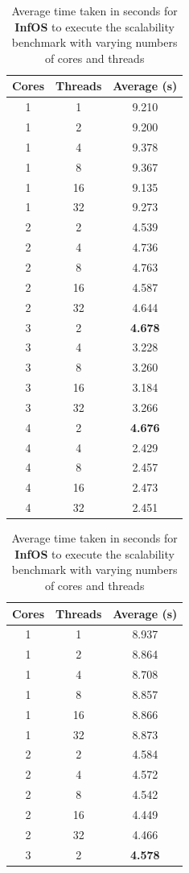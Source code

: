 \documentclass[bsc,frontabs,singlespacing,parskip,deptreport]{infthesis}
\begin{document}
\begin{table}[h]
\parbox{.45\linewidth}{
\centering
\scriptsize
\begin{tabular}{ccc}
\toprule
Cores &Threads &Average (s) \\
\midrule
1 &1 &9.210 \\
\midrule
1 &2 &9.200 \\
1 &4 &9.378 \\
1 &8 &9.367 \\
1 &16 &9.135 \\
1 &32 &9.273 \\
\midrule
2 &2 &4.539 \\
2 &4 &4.736 \\
2 &8 &4.763 \\
2 &16 &4.587 \\
2 &32 &4.644 \\
\midrule
3 &2 &\textbf{4.678} \\
3 &4 &3.228 \\
3 &8 &3.260 \\
3 &16 &3.184 \\
3 &32 &3.266 \\
\midrule
4 &2 &\textbf{4.676} \\
4 &4 &2.429 \\
4 &8 &2.457 \\
4 &16 &2.473 \\
4 &32 &2.451 \\
\bottomrule
\end{tabular}
\caption{Average time taken in seconds for \textbf{InfOS} to execute the scalability benchmark with varying numbers of cores and threads}\label{timing-scalability-infos}
}
\hfill
\parbox{.45\linewidth}{
\centering
\scriptsize
\begin{tabular}{ccc}
\toprule
Cores &Threads &Average (s) \\
\midrule
1 &1 &8.937 \\
\midrule
1 &2 &8.864 \\
1 &4 &8.708 \\
1 &8 &8.857 \\
1 &16 &8.866 \\
1 &32 &8.873 \\
\midrule
2 &2 &4.584 \\
2 &4 &4.572 \\
2 &8 &4.542 \\
2 &16 &4.449 \\
2 &32 &4.466 \\
\midrule
3 &2 &\textbf{4.578} \\

\end{tabular}}
\end{table}
\end{document}

